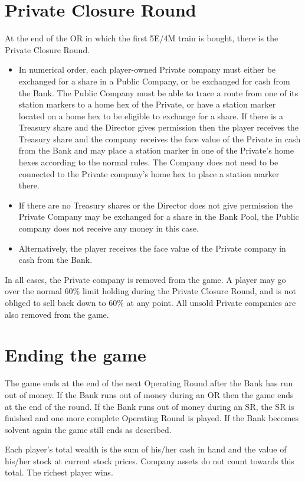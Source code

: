 \documentclass[a4paper,twocolumn]{article}
\begin{document}
\section{Private Closure Round}\label{sec:closing}
At the end of the OR in which the first 5E/4M train is bought, there is the
Private Closure Round.
\begin{itemize}
	\item In numerical order, each player-owned Private company must either be
	exchanged for a share in a Public Company, or be exchanged for cash from the
	Bank. The Public Company must be able to trace a route from one of its
	station markers to a home hex of the Private, or have a station marker
	located on a home hex to be eligible to exchange for a share. If there is a
	Treasury share and the Director gives permission then the player receives
	the Treasury share and the company receives the face value of the Private in
	cash from the Bank and may place a station marker in one of the Private's
	home hexes according to the normal rules. The Company does not need to be
	connected to the Private company's home hex to place a station marker there.
	\item If there are no Treasury shares or the Director does not give
	permission the Private Company may be exchanged for a share in the Bank
	Pool, the Public company does not receive any money in this case.
	\item Alternatively, the player receives the face value of the Private
	company in cash from the Bank.
\end{itemize}
In all cases, the Private company is removed from the game. A player may go over
the normal 60\% limit holding during the Private Closure Round, and is not
obliged to sell back down to 60\% at any point. All unsold Private companies
are also removed from the game.

\section{Ending the game}
The game ends at the end of the next Operating Round after the Bank has run out
of money. If the Bank runs out of money during an OR then the game ends at the
end of the round. If the Bank runs out of money during an SR, the SR is finished
and one more complete Operating Round is played. If the Bank becomes solvent
again the game still ends as described.

Each player's total wealth is the sum of his/her cash in hand and the value of
his/her stock at current stock prices. Company assets do not count towards this
total. The richest player wins.
\end{document}
